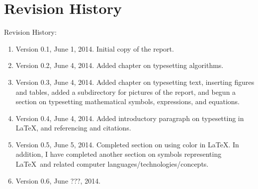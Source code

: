 






\chapter*{Revision History}
\label{chp:revisionhistory}


Revision History: \vspace{-0.3cm}
\begin{enumerate} \itemsep -4pt
\item Version 0.1, June 1, 2014. Initial copy of the report.
\item Version 0.2, June 4, 2014. Added chapter on typesetting algorithms.
\item Version 0.3, June 4, 2014. Added chapter on typesetting text, inserting figures and tables, added a subdirectory for pictures of the report, and begun a section on typesetting mathematical symbols, expressions, and equations.
\item Version 0.4, June 4, 2014. Added introductory paragraph on typesetting in \LaTeX, and referencing and citations.
\item Version 0.5, June 5, 2014. Completed section on using color in \LaTeX. In addition, I have completed another section on symbols representing \LaTeX\ and related computer languages/technologies/concepts.
\item Version 0.6, June ???, 2014. 
\end{enumerate}


